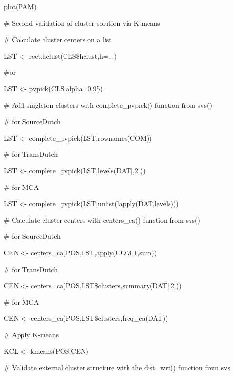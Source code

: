 plot(PAM)



\# Second validation of cluster solution via K-means



\# Calculate cluster centers on a list



LST <- rect.hclust(CLS\$hclust,h=...)



\#or



LST <- pvpick(CLS,alpha=0.95) 



\# Add singleton clusters with complete\_pvpick() function from svs()



\# for SourceDutch



LST <- complete\_pvpick(LST,rownames(COM))



\# for TransDutch



LST <- complete\_pvpick(LST,levels(DAT[,2]))



\# for MCA



LST <- complete\_pvpick(LST,unlist(lapply(DAT,levels)))



\# Calculate cluster centers with centers\_ca() function from svs()



\# for SourceDutch



CEN <- centers\_ca(POS,LST,apply(COM,1,sum))



\# for TransDutch



CEN <- centers\_ca(POS,LST\$clusters,summary(DAT[,2]))



\# for MCA



CEN <- centers\_ca(POS,LST\$clusters,freq\_ca(DAT))



\# Apply K-means



KCL <- kmeans(POS,CEN)



\# Validate external cluster structure with the dist\_wrt() function from svs



